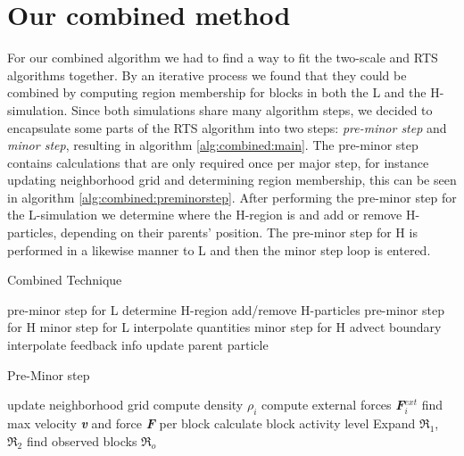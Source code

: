 \documentclass[../../main.tex]{subfiles}
\begin{document}
\tracingall

\section{Our combined method}

For our combined algorithm we had to find a way to fit the two-scale and RTS algorithms together. By an iterative process we found that they could be combined by computing region membership for blocks in both the L and the H-simulation. Since both simulations share many algorithm steps, we decided to encapsulate some parts of the RTS algorithm into two steps: \textit{pre-minor step} and \textit{minor step}, resulting in algorithm \ref{alg:combined:main}. The pre-minor step contains calculations that are only required once per major step, for instance updating neighborhood grid and determining region membership, this can be seen in algorithm \ref{alg:combined:preminorstep}. After performing the pre-minor step for the L-simulation we determine where the H-region is and add or remove H-particles, depending on their parents' position. The pre-minor step for H is performed in a likewise manner to L and then the minor step loop is entered. 

\begin{algorithm}[h]
    \caption{Combined Technique}
    \label{alg:combined:main}
    \begin{algorithmic}[1]
            \State pre-minor step for L
            \State determine H-region
            \State add/remove H-particles
            \State pre-minor step for H
                \State minor step for L
                \State interpolate quantities
                  \State minor step for H
                  \State advect boundary
                \EndFor
            \State interpolate feedback info
            \EndFor
            \State update parent particle
        \EndWhile
   \end{algorithmic}
\end{algorithm}


\begin{algorithm}[h]
    \caption{Pre-Minor step}
    \label{alg:combined:preminorstep}
    \begin{algorithmic}[1]
    \State update neighborhood grid
        \State compute density $\rho_i$ 
    \EndFor
        \State compute external forces \textbf{\textit{F}}$^{ext}_i$
    \EndFor
    \State find max velocity \textbf{\textit{v}} and force \textbf{\textit{F}} per block
    \State calculate block activity level
    \State Expand $\Re_1$, $\Re_2$
    \State find observed blocks $\Re_o$
   \end{algorithmic}
\end{algorithm}
\end{document}
